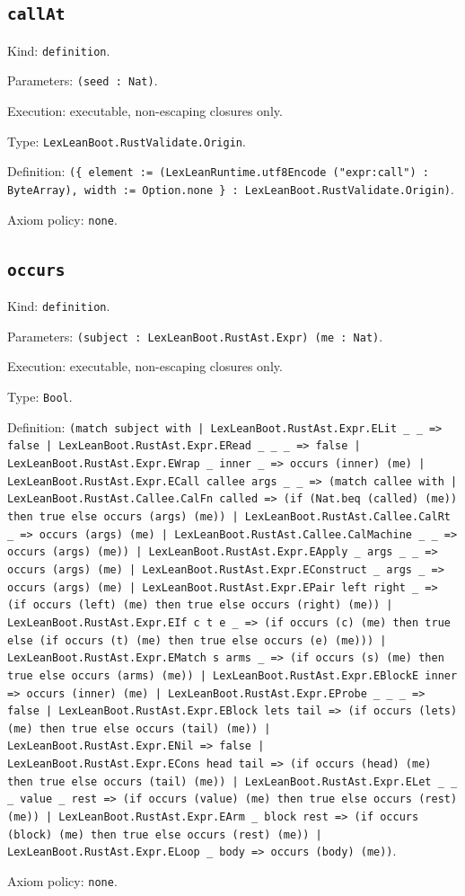 \documentclass[11pt]{article}
\begin{document}
\subsection*{\texttt{callAt}}
\noindent Kind: \texttt{definition}.\par
\noindent Parameters: \texttt{(seed : Nat)}.\par
\noindent Execution: executable, non-escaping closures only.\par
\noindent Type: \texttt{LexLeanBoot.RustValidate.Origin}.\par
\noindent Definition: \texttt{(\{ element := (LexLeanRuntime.utf8Encode ("expr:call") : ByteArray), width := Option.none \} : LexLeanBoot.RustValidate.Origin)}.\par
\noindent Axiom policy: \texttt{none}.\par
\subsection*{\texttt{occurs}}
\noindent Kind: \texttt{definition}.\par
\noindent Parameters: \texttt{(subject : LexLeanBoot.RustAst.Expr) (me : Nat)}.\par
\noindent Execution: executable, non-escaping closures only.\par
\noindent Type: \texttt{Bool}.\par
\noindent Definition: \texttt{(match subject with | LexLeanBoot.RustAst.Expr.ELit \_ \_ => false | LexLeanBoot.RustAst.Expr.ERead \_ \_ \_ => false | LexLeanBoot.RustAst.Expr.EWrap \_ inner \_ => occurs (inner) (me) | LexLeanBoot.RustAst.Expr.ECall callee args \_ \_ => (match callee with | LexLeanBoot.RustAst.Callee.CalFn called => (if (Nat.beq (called) (me)) then true else occurs (args) (me)) | LexLeanBoot.RustAst.Callee.CalRt \_ => occurs (args) (me) | LexLeanBoot.RustAst.Callee.CalMachine \_ \_ => occurs (args) (me)) | LexLeanBoot.RustAst.Expr.EApply \_ args \_ \_ => occurs (args) (me) | LexLeanBoot.RustAst.Expr.EConstruct \_ args \_ => occurs (args) (me) | LexLeanBoot.RustAst.Expr.EPair left right \_ => (if occurs (left) (me) then true else occurs (right) (me)) | LexLeanBoot.RustAst.Expr.EIf c t e \_ => (if occurs (c) (me) then true else (if occurs (t) (me) then true else occurs (e) (me))) | LexLeanBoot.RustAst.Expr.EMatch s arms \_ => (if occurs (s) (me) then true else occurs (arms) (me)) | LexLeanBoot.RustAst.Expr.EBlockE inner => occurs (inner) (me) | LexLeanBoot.RustAst.Expr.EProbe \_ \_ \_ => false | LexLeanBoot.RustAst.Expr.EBlock lets tail => (if occurs (lets) (me) then true else occurs (tail) (me)) | LexLeanBoot.RustAst.Expr.ENil => false | LexLeanBoot.RustAst.Expr.ECons head tail => (if occurs (head) (me) then true else occurs (tail) (me)) | LexLeanBoot.RustAst.Expr.ELet \_ \_ \_ value \_ rest => (if occurs (value) (me) then true else occurs (rest) (me)) | LexLeanBoot.RustAst.Expr.EArm \_ block rest => (if occurs (block) (me) then true else occurs (rest) (me)) | LexLeanBoot.RustAst.Expr.ELoop \_ body => occurs (body) (me))}.\par
\noindent Axiom policy: \texttt{none}.\par
\end{document}
